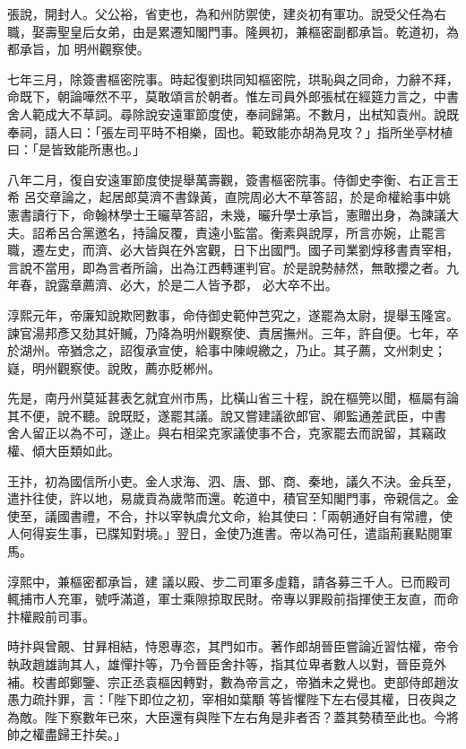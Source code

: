 \begin{pinyinscope}
 張說，開封人。父公裕，省吏也，為和州防禦使，建炎初有軍功。說受父任為右職，娶壽聖皇后女弟，由是累遷知閣門事。隆興初，兼樞密副都承旨。乾道初，為都承旨，加
 明州觀察使。



 七年三月，除簽書樞密院事。時起復劉珙同知樞密院，珙恥與之同命，力辭不拜，命既下，朝論嘩然不平，莫敢頌言於朝者。惟左司員外郎張栻在經筵力言之，中書舍人範成大不草詞。尋除說安遠軍節度使，奉祠歸第。不數月，出栻知袁州。說既奉祠，語人曰：「張左司平時不相樂，固也。範致能亦胡為見攻？」指所坐亭材植曰：「是皆致能所惠也。」



 八年二月，復自安遠軍節度使提舉萬壽觀，簽書樞密院事。侍御史李衡、右正言王希
 呂交章論之，起居郎莫濟不書錄黃，直院周必大不草答詔，於是命權給事中姚憲書讀行下，命翰林學士王曮草答詔，未幾，曮升學士承旨，憲贈出身，為諫議大夫。詔希呂合黨邀名，持論反覆，責遠小監當。衡素與說厚，所言亦婉，止罷言職，遷左史，而濟、必大皆與在外宮觀，日下出國門。國子司業劉焞移書責宰相，言說不當用，即為言者所論，出為江西轉運判官。於是說勢赫然，無敢攖之者。九年春，說露章薦濟、必大，於是二人皆予郡，
 必大卒不出。



 淳熙元年，帝廉知說欺罔數事，命侍御史範仲芑究之，遂罷為太尉，提舉玉隆宮。諫官湯邦彥又劾其奸贓，乃降為明州觀察使、責居撫州。三年，許自便。七年，卒於湖州。帝猶念之，詔復承宣使，給事中陳峴繳之，乃止。其子薦，文州刺史；嶷，明州觀察使。說敗，薦亦貶郴州。



 先是，南丹州莫延葚表乞就宜州市馬，比橫山省三十程，說在樞筦以聞，樞屬有論其不便，說不聽。說既貶，遂罷其議。說又嘗建議欲郎官、卿監通差武臣，中書
 舍人留正以為不可，遂止。與右相梁克家議使事不合，克家罷去而說留，其竊政權、傾大臣類如此。



 王抃，初為國信所小吏。金人求海、泗、唐、鄧、商、秦地，議久不決。金兵至，遣抃往使，許以地，易歲貢為歲幣而還。乾道中，積官至知閣門事，帝親信之。金使至，議國書禮，不合，抃以宰執虞允文命，紿其使曰：「兩朝通好自有常禮，使人何得妄生事，已牒知對境。」翌日，金使乃進書。帝以為可任，遣詣荊襄點閱軍馬。



 淳熙中，兼樞密都承旨，建
 議以殿、步二司軍多虛籍，請各募三千人。已而殿司輒捕市人充軍，號呼滿道，軍士乘隙掠取民財。帝專以罪殿前指揮使王友直，而命抃權殿前司事。



 時抃與曾覿、甘昪相結，恃恩專恣，其門如市。著作郎胡晉臣嘗論近習怙權，帝令執政趙雄詢其人，雄憚抃等，乃令晉臣舍抃等，指其位卑者數人以對，晉臣竟外補。校書郎鄭鑒、宗正丞袁樞因轉對，數為帝言之，帝猶未之覺也。吏部侍郎趙汝愚力疏抃罪，言：「陛下即位之初，宰相如葉顒
 等皆懼陛下左右侵其權，日夜與之為敵。陛下察數年已來，大臣還有與陛下左右角是非者否？蓋其勢積至此也。今將帥之權盡歸王抃矣。」




\end{pinyinscope}
